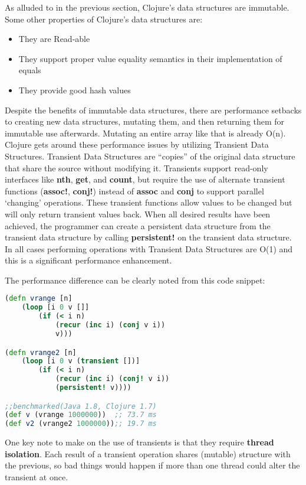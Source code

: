     As alluded to in the previous section, Clojure's data structures are immutable. Some other properties of Clojure's data structures are:
    \begin{itemize}
        \item They are Read-able
        \item They support proper value equality semantics in their implementation of equals
        \item They provide good hash values
    \end{itemize}
    \cite{website:clojure-lang-reference} Despite the benefits of immutable data structures, there are performance setbacks to creating new data structures, mutating them, and then returning them for immutable use afterwards. Mutating an entire array like that is already O(n). Clojure gets around these performance issues by utilizing Transient Data Structures. Transient Data Structures are ``copies'' of the original data structure that share the source without modifying it. Transients support read-only interfaces like \textbf{nth}, \textbf{get}, and \textbf{count}, but require the use of alternate transient functions (\textbf{assoc!}, \textbf{conj!}) instead of \textbf{assoc} and \textbf{conj} to support parallel `changing' operations. These transient functions allow values to be changed but will only return transient values back. When all desired results have been achieved, the programmer can create a persistent data structure from the transient data structure by calling \textbf{persistent!} on the transient data structure. In all cases performing operations with Transient Data Structures are O(1) and this is a significant performance enhancement.
    
    The performance difference can be clearly noted from this code snippet:
	\begin{lstlisting}[language=clojure]
(defn vrange [n]
	(loop [i 0 v []]
		(if (< i n)
			(recur (inc i) (conj v i))
			v)))

(defn vrange2 [n]
	(loop [i 0 v (transient [])]
		(if (< i n)
			(recur (inc i) (conj! v i))
			(persistent! v))))

;;benchmarked(Java 1.8, Clojure 1.7)
(def v (vrange 1000000))  ;; 73.7 ms
(def v2 (vrange2 1000000));; 19.7 ms
	\end{lstlisting}
    
    One key note to make on the use of transients is that they require \textbf{thread isolation}. Each result of a transient operation shares (mutable) structure with the previous, so bad things would happen if more than one thread could alter the transient at once. \cite{website:clojure-lang-reference}

